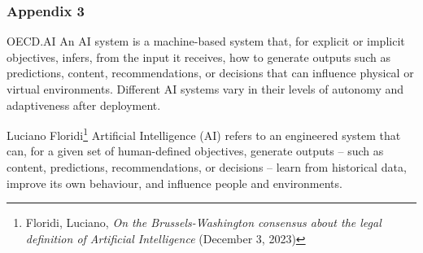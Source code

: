 \documentclass{beamer}
\begin{document}
\begin{frame}[noframenumbering]
\frametitle{Appendix 3}
\begin{block}{OECD.AI}
An AI system is a machine-based system that, for explicit or implicit objectives, infers, from the input it receives, how to generate outputs such as predictions, content, recommendations, or decisions that can influence physical or virtual environments. Different AI systems vary in their levels of autonomy and adaptiveness after deployment.
\end{block}
\begin{block}{Luciano Floridi\footnote[frame]{Floridi, Luciano, \emph{On the Brussels-Washington consensus about the legal definition of Artificial Intelligence} (December 3, 2023)}}
Artificial Intelligence (AI) refers to an engineered system that can, for a given set of human-defined objectives, generate outputs – such as content, predictions, recommendations, or decisions – learn from historical data, improve its own behaviour, and influence people and environments.
\end{block}

\end{frame}
\end{document}
